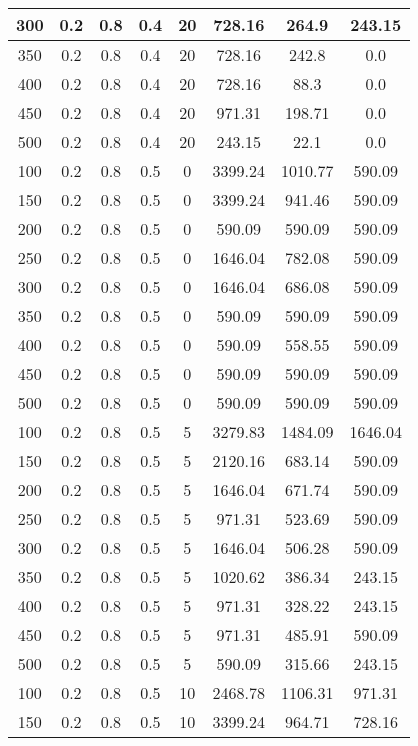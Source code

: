 \documentclass[a4paper, 12pt]{extreport}
\begin{document}
\begin{itemize}
\begin{longtable}{|c|c|c|c|c|c|c|c|}
			300 & 0.2 & 0.8 & 0.4 & 20 & 728.16 & 264.9 & 243.15 \\\hline
			350 & 0.2 & 0.8 & 0.4 & 20 & 728.16 & 242.8 & 0.0 \\\hline
			400 & 0.2 & 0.8 & 0.4 & 20 & 728.16 & 88.3 & 0.0 \\\hline
			450 & 0.2 & 0.8 & 0.4 & 20 & 971.31 & 198.71 & 0.0 \\\hline
			500 & 0.2 & 0.8 & 0.4 & 20 & 243.15 & 22.1 & 0.0 \\\hline
			100 & 0.2 & 0.8 & 0.5 & 0 & 3399.24 & 1010.77 & 590.09 \\\hline
			150 & 0.2 & 0.8 & 0.5 & 0 & 3399.24 & 941.46 & 590.09 \\\hline
			200 & 0.2 & 0.8 & 0.5 & 0 & 590.09 & 590.09 & 590.09 \\\hline
			250 & 0.2 & 0.8 & 0.5 & 0 & 1646.04 & 782.08 & 590.09 \\\hline
			300 & 0.2 & 0.8 & 0.5 & 0 & 1646.04 & 686.08 & 590.09 \\\hline
			350 & 0.2 & 0.8 & 0.5 & 0 & 590.09 & 590.09 & 590.09 \\\hline
			400 & 0.2 & 0.8 & 0.5 & 0 & 590.09 & 558.55 & 590.09 \\\hline
			450 & 0.2 & 0.8 & 0.5 & 0 & 590.09 & 590.09 & 590.09 \\\hline
			500 & 0.2 & 0.8 & 0.5 & 0 & 590.09 & 590.09 & 590.09 \\\hline
			100 & 0.2 & 0.8 & 0.5 & 5 & 3279.83 & 1484.09 & 1646.04 \\\hline
			150 & 0.2 & 0.8 & 0.5 & 5 & 2120.16 & 683.14 & 590.09 \\\hline
			200 & 0.2 & 0.8 & 0.5 & 5 & 1646.04 & 671.74 & 590.09 \\\hline
			250 & 0.2 & 0.8 & 0.5 & 5 & 971.31 & 523.69 & 590.09 \\\hline
			300 & 0.2 & 0.8 & 0.5 & 5 & 1646.04 & 506.28 & 590.09 \\\hline
			350 & 0.2 & 0.8 & 0.5 & 5 & 1020.62 & 386.34 & 243.15 \\\hline
			400 & 0.2 & 0.8 & 0.5 & 5 & 971.31 & 328.22 & 243.15 \\\hline
			450 & 0.2 & 0.8 & 0.5 & 5 & 971.31 & 485.91 & 590.09 \\\hline
			500 & 0.2 & 0.8 & 0.5 & 5 & 590.09 & 315.66 & 243.15 \\\hline
			100 & 0.2 & 0.8 & 0.5 & 10 & 2468.78 & 1106.31 & 971.31 \\\hline
			150 & 0.2 & 0.8 & 0.5 & 10 & 3399.24 & 964.71 & 728.16 \\\hline

\end{longtable}
\end{itemize}
\end{document}
